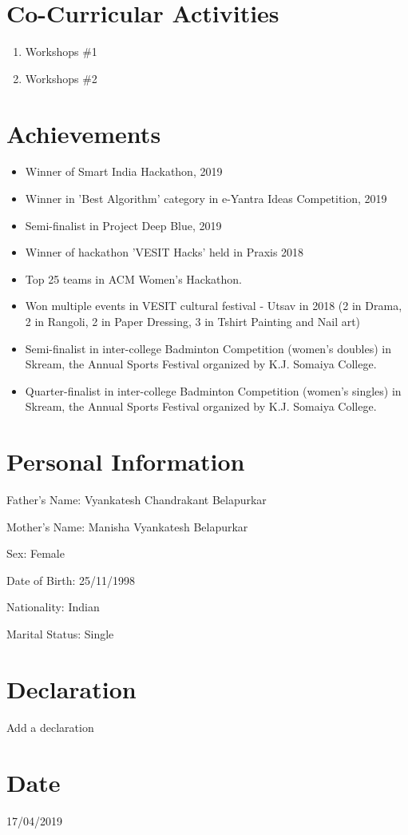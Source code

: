 \documentclass[margin]{res}
\begin{document}
\begin{resume}
\section{Co-Curricular Activities}
\begin{enumerate}
\item Workshops \#1
\item Workshops \#2
\end{enumerate}

\section{Achievements}
\begin{itemize}
\item Winner of Smart India Hackathon, 2019
\item Winner in 'Best Algorithm' category in e-Yantra Ideas Competition, 2019
\item Semi-finalist in Project Deep Blue, 2019
\item Winner of hackathon 'VESIT Hacks' held in Praxis 2018
\item Top 25 teams in ACM Women's Hackathon. 
\item Won multiple events in VESIT cultural festival - Utsav in 2018 (2 in Drama, 2 in Rangoli, 2 in Paper Dressing, 3 in Tshirt Painting and Nail art)
\item Semi-finalist in inter-college Badminton Competition (women's doubles) in Skream, the Annual Sports Festival organized by K.J. Somaiya College.
\item Quarter-finalist in inter-college Badminton Competition (women's singles) in Skream, the Annual Sports Festival organized by K.J. Somaiya College.
\end{itemize}

\section{Personal Information}
Father's Name: Vyankatesh Chandrakant Belapurkar

Mother's Name: Manisha Vyankatesh Belapurkar

Sex: Female

Date of Birth: 25/11/1998

Nationality: Indian

Marital Status: Single

\section{Declaration}
Add a declaration

\section{Date}
17/04/2019

\end{resume}
\end{document}
